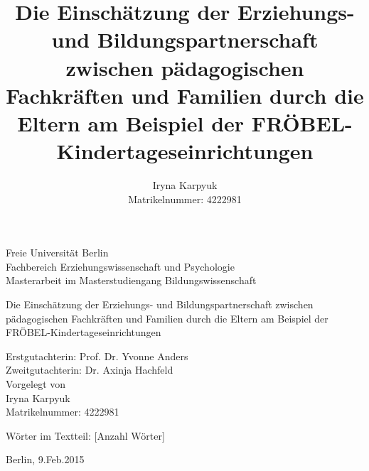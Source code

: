 \documentclass[12pt,a4paper]{article}
\author{Iryna Karpyuk \\
Matrikelnummer: 4222981}
\title{Die Einschätzung der Erziehungs- und Bildungspartnerschaft zwischen pädagogischen Fachkräften und Familien durch die Eltern am Beispiel der FRÖBEL-Kindertageseinrichtungen}
\begin{document}
\begin{titlepage}

\normalsize

\begin{center}
Freie Universität Berlin \\
Fachbereich Erziehungswissenschaft und Psychologie\\
Masterarbeit im Masterstudiengang Bildungswissenschaft
\end{center}

\vspace{30pt}

\begin{center}
\LARGE{%
Die Einschätzung der Erziehungs- und Bildungspartnerschaft zwischen pädagogischen Fachkräften und Familien durch die Eltern am Beispiel der FRÖBEL-Kindertageseinrichtungen
}%
\\  
\vspace{50pt}
 \end{center}
                         
\normalsize  
\begin{center}
Erstgutachterin:  Prof. Dr. Yvonne Anders\\
Zweitgutachterin:  Dr. Axinja Hachfeld\\
\vspace{10pt}
Vorgelegt von\\ 
Iryna Karpyuk \\
Matrikelnummer: 4222981\\
\end{center}                  
Wörter im Textteil: [Anzahl Wörter]\\     

\begin{center}
\normalsize
\vspace{150pt}

Berlin, 9.Feb.2015
\end{center}
\end{titlepage}
\normalsize                                              
\pagebreak

\end{document}
